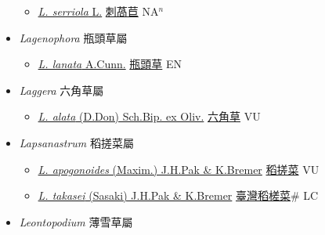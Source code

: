 \begin{itemize}
  \begin{itemize}
        \item[] \href{http://www.theplantlist.org/tpl1.1/search?q=Lactuca+serriola}{\textit{L. serriola} L.}   \href{\detokenize{http://taibnet.sinica.edu.tw/chi/taibnet_species_list.php?T2=刺萵苣&T2_new_value=true&fr=y}}{刺萵苣} NA$^n$
  \end{itemize}
 \item[] \textit{Lagenophora} 瓶頭草屬
                    
  \begin{itemize}
        \item[] \href{http://www.theplantlist.org/tpl1.1/search?q=Lagenophora+lanata}{\textit{L. lanata} A.Cunn.}   \href{\detokenize{http://taibnet.sinica.edu.tw/chi/taibnet_species_list.php?T2=瓶頭草&T2_new_value=true&fr=y}}{瓶頭草} EN
  \end{itemize}
 \item[] \textit{Laggera} 六角草屬
                    
  \begin{itemize}
        \item[] \href{http://www.theplantlist.org/tpl1.1/search?q=Laggera+alata}{\textit{L. alata} (D.Don) Sch.Bip. ex Oliv.}   \href{\detokenize{http://taibnet.sinica.edu.tw/chi/taibnet_species_list.php?T2=六角草&T2_new_value=true&fr=y}}{六角草} VU
  \end{itemize}
 \item[] \textit{Lapsanastrum} 稻搓菜屬
                    
  \begin{itemize}
        \item[] \href{http://www.theplantlist.org/tpl1.1/search?q=Lapsanastrum+apogonoides}{\textit{L. apogonoides} (Maxim.) J.H.Pak \& K.Bremer}   \href{\detokenize{http://taibnet.sinica.edu.tw/chi/taibnet_species_list.php?T2=稻搓菜&T2_new_value=true&fr=y}}{稻搓菜} VU
        \item[] \href{http://www.theplantlist.org/tpl1.1/search?q=Lapsanastrum+takasei}{\textit{L. takasei} (Sasaki) J.H.Pak \& K.Bremer}   \href{\detokenize{http://taibnet.sinica.edu.tw/chi/taibnet_species_list.php?T2=臺灣稻槎菜&T2_new_value=true&fr=y}}{臺灣稻槎菜}\# LC
  \end{itemize}
 \item[] \textit{Leontopodium} 薄雪草屬
                    

\end{itemize}
